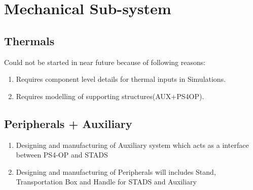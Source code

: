 \documentclass[../../main.tex]{subfiles}
\begin{document}
\chapter{Mechanical Sub-system}
\thispagestyle{fancy}

%
%
%
%








\section{Thermals}
\text Could not be started in near future because of following reasons:
\begin{enumerate}
    \item Requires component level details for thermal inputs in Simulations.
    \item Requires modelling of supporting structures(AUX+PS4OP).
\end{enumerate}

\newpage


\section{Peripherals + Auxiliary} 
\begin{enumerate}
    \item Designing and manufacturing of Auxiliary system which acts as a interface between PS4-OP and STADS
    \item Designing and manufacturing of Peripherals will includes Stand, Transportation Box and Handle for STADS and Auxiliary
\end{enumerate}
\end{document}
